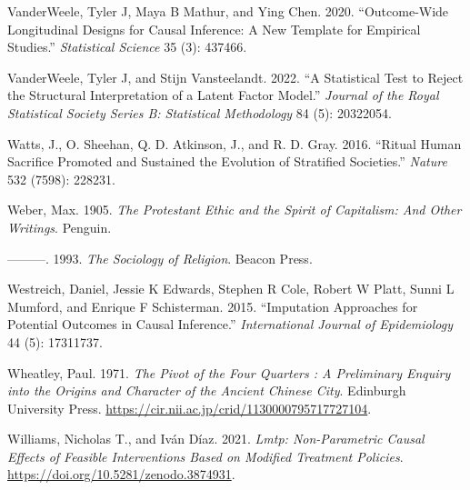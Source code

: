 \documentclass[
  singlecolumn]{report}
\newlength{\cslhangindent}
\newlength{\cslentryspacingunit} %
\newenvironment{CSLReferences}[2] %
 {%
  \setlength{\parindent}{0pt}
  \ifodd #1
  \let\oldpar\par
  \def\par{\hangindent=\cslhangindent\oldpar}
  \fi
  \setlength{\parskip}{#2\cslentryspacingunit}
 }%
 {}
\begin{document}
\begin{CSLReferences}{1}{0}
\leavevmode{}%
VanderWeele, Tyler J, Maya B Mathur, and Ying Chen. 2020.
{``Outcome-Wide Longitudinal Designs for Causal Inference: A New
Template for Empirical Studies.''} \emph{Statistical Science} 35 (3):
437466.

\leavevmode{}%
VanderWeele, Tyler J, and Stijn Vansteelandt. 2022. {``A Statistical
Test to Reject the Structural Interpretation of a Latent Factor
Model.''} \emph{Journal of the Royal Statistical Society Series B:
Statistical Methodology} 84 (5): 20322054.

\leavevmode{}%
Watts, J., O. Sheehan, Q. D. Atkinson, J., and R. D. Gray. 2016.
{``Ritual Human Sacrifice Promoted and Sustained the Evolution of
Stratified Societies.''} \emph{Nature} 532 (7598): 228231.

\leavevmode{}%
Weber, Max. 1905. \emph{The Protestant Ethic and the Spirit of
Capitalism: And Other Writings}. Penguin.

\leavevmode{}%
---------. 1993. \emph{The Sociology of Religion}. Beacon Press.

\leavevmode{}%
Westreich, Daniel, Jessie K Edwards, Stephen R Cole, Robert W Platt,
Sunni L Mumford, and Enrique F Schisterman. 2015. {``Imputation
Approaches for Potential Outcomes in Causal Inference.''}
\emph{International Journal of Epidemiology} 44 (5): 17311737.

\leavevmode{}%
Wheatley, Paul. 1971. \emph{The Pivot of the Four Quarters : A
Preliminary Enquiry into the Origins and Character of the Ancient
Chinese City}. Edinburgh University Press.
\url{https://cir.nii.ac.jp/crid/1130000795717727104}.

\leavevmode{}%
Williams, Nicholas T., and Iván Díaz. 2021. \emph{Lmtp: Non-Parametric
Causal Effects of Feasible Interventions Based on Modified Treatment
Policies}. \url{https://doi.org/10.5281/zenodo.3874931}.

\end{CSLReferences}
\end{document}
